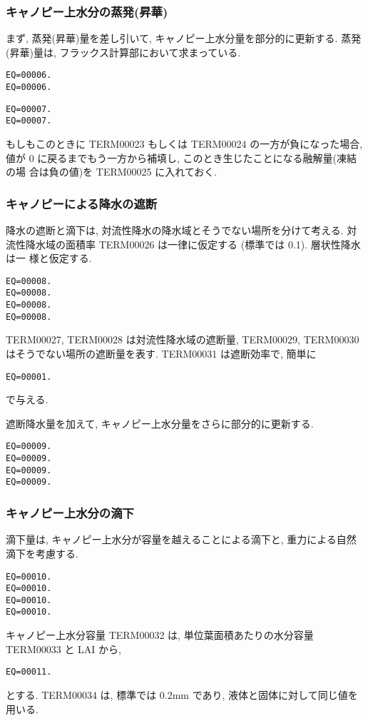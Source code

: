 \subsubsection{キャノピー上水分の蒸発(昇華)}

まず, 蒸発(昇華)量を差し引いて, キャノピー上水分量を部分的に更新する.
蒸発(昇華)量は, フラックス計算部において求まっている.
\begin{verbatim}
EQ=00006.
EQ=00006.
\end{verbatim}
\begin{verbatim}
EQ=00007.
EQ=00007.
\end{verbatim}
もしもこのときに TERM00023 もしくは TERM00024 の一方が負になった場合, 値が
0 に戻るまでもう一方から補填し, このとき生じたことになる融解量(凍結の場
合は負の値)を TERM00025 に入れておく.

\subsubsection{キャノピーによる降水の遮断}

降水の遮断と滴下は, 対流性降水の降水域とそうでない場所を分けて考える. 対
流性降水域の面積率 TERM00026 は一律に仮定する (標準では 0.1). 層状性降水は一
様と仮定する.
\begin{verbatim}
EQ=00008.
EQ=00008.
EQ=00008.
EQ=00008.
\end{verbatim}

TERM00027, TERM00028 は対流性降水域の遮断量, TERM00029,
TERM00030 はそうでない場所の遮断量を表す.
TERM00031 は遮断効率で, 簡単に
\begin{verbatim}
EQ=00001.
\end{verbatim}
で与える.

遮断降水量を加えて, キャノピー上水分量をさらに部分的に更新する.
\begin{verbatim}
EQ=00009.
EQ=00009.
EQ=00009.
EQ=00009.
\end{verbatim}

\subsubsection{キャノピー上水分の滴下}

滴下量は, キャノピー上水分が容量を越えることによる滴下と, 重力による自然
滴下を考慮する.
\begin{verbatim}
EQ=00010.
EQ=00010.
EQ=00010.
EQ=00010.
\end{verbatim}
キャノピー上水分容量 TERM00032 は, 単位葉面積あたりの水分容量
TERM00033 と LAI から,
\begin{verbatim}
EQ=00011.
\end{verbatim}
とする.
TERM00034 は, 標準では 0.2mm であり, 液体と固体に対して同じ値を用いる.

